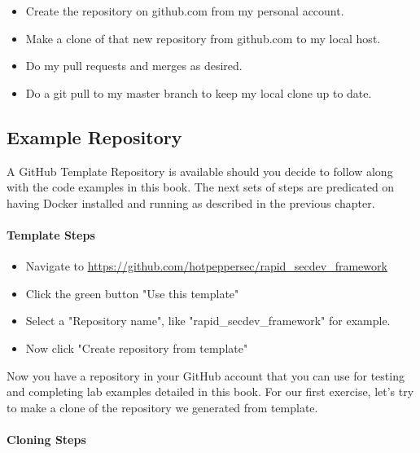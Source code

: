 \begin{itemize}

      \item
            Create the repository on github.com from my personal account.
      \item
            Make a clone of that new repository from github.com to my local host.
      \item
            Do my pull requests and merges as desired.
      \item
            Do a git pull to my master branch to keep my local clone up to date.
\end{itemize}


\subsection{Example Repository}

\justify
A GitHub Template Repository is available should you decide to follow
along with the code examples in this book. The next sets of steps are
predicated on having Docker installed and running as described in the
previous chapter.


\paragraph{Template Steps}

\begin{itemize}

      \item
            Navigate to
            \url{https://github.com/hotpeppersec/rapid_secdev_framework}
      \item
            Click the green button "Use this template"
      \item
            Select a "Repository name", like "rapid\_secdev\_framework" for
            example.
      \item
            Now click "Create repository from template"
\end{itemize}

\justify
Now you have a repository in your GitHub account that you can use for
testing and completing lab examples detailed in this book. For our first
exercise, let's try to make a clone of the repository we generated from
template.


\paragraph{Cloning Steps}

